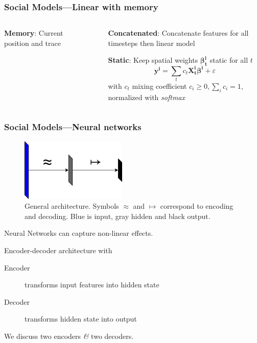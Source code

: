\documentclass{beamer}
\begin{document}
\begin{frame}
  \frametitle{Social Models---Linear with memory}
  \begin{columns}
   \begin{column}{0.5\textwidth}

 \textbf{Memory}: Current position and trace

\end{column}~\begin{column}{0.5\textwidth}
  \textbf{Concatenated}:
  Concatenate features for all timesteps then linear model

  \textbf{Static}:
  Keep spatial weights $\bm{\beta^i_t}$ static for all $t$ 
\begin{equation*}
  \bm{y^i} = \sum_t c_t \bm{X_t^i} \bm{\beta^i} + \varepsilon
\end{equation*}
with $c_t$ mixing coefficient $c_i \geq 0, \sum_i c_i = 1$,
normalized with \textit{softmax}

   \end{column}
 \end{columns}
  
\end{frame}

\begin{frame}
  \frametitle{Social Models---Neural networks}
  \begin{figure}[h]
    \centering
    \includegraphics[width=0.45\textwidth]{rf_encoder_decoder}
    \caption*{General architecture.
      Symbols $\approx$ and $\mapsto$ correspond to encoding and decoding. Blue is input, gray hidden and black output.}
  \end{figure}
  \vspace{-0.5cm}
 Neural Networks can capture non-linear effects.

 Encoder-decoder architecture with
 \begin{description}
 \item[Encoder] transforms input features into hidden state
  \item[Decoder] transforms hidden state into output
 \end{description}

 We discuss two encoders \textit{\&} two decoders.
\end{frame}
\end{document}
